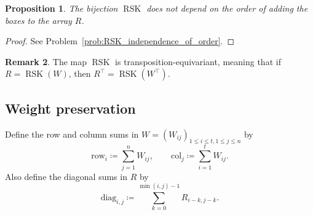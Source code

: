 \documentclass[letterpaper,11pt,oneside,reqno]{article}
\numberwithin{equation}{section}
\newtheorem{proposition}{Proposition}[section]
\theoremstyle{definition}
\newtheorem{remark}[proposition]{Remark}
\begin{document}
\begin{proposition}
\label{prop:RSK_independence_of_order}
	The bijection $\operatorname{RSK}$ does not depend on the order
	of adding the boxes to the array $R$.
\end{proposition}
\begin{proof}
	See Problem~\ref{prob:RSK_independence_of_order}.
\end{proof}

\begin{remark}
	The map $\operatorname{RSK}$
	is transposition-equivariant, meaning that
	if $R=\operatorname{RSK}(W)$, then
	$R^{\top}=\operatorname{RSK}(W^{\top})$.
\end{remark}


\subsection{Weight preservation}

Define
the row and column sums in $W=(W_{ij})_{1\le i\le t, 1\le j\le n}$ by
\begin{equation*}
	\mathrm{row}_i\coloneqq \sum_{j=1}^n W_{ij}, \qquad
	\mathrm{col}_j \coloneqq \sum_{i=1}^t W_{ij}.
\end{equation*}
Also define the diagonal sums in $R$ by
\begin{equation*}
	\mathrm{diag}_{i,j}\coloneqq \sum_{k=0}^{\min(i,j)-1}R_{i-k,j-k}.
\end{equation*}
\end{document}
